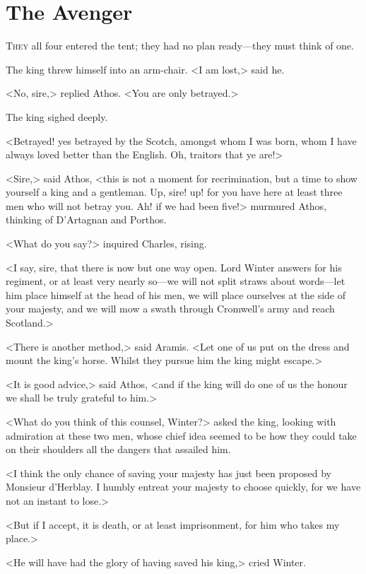 \chapter{The Avenger}

 \lettrine{T}{hey} all four entered the tent; they had no plan ready—they must think of one.

\zz
The king threw himself into an arm-chair. <I am lost,> said he.

\zz
<No, sire,> replied Athos. <You are only betrayed.>

The king sighed deeply.

<Betrayed! yes betrayed by the Scotch, amongst whom I was born, whom I have always loved better than the English. Oh, traitors that ye are!>

<Sire,> said Athos, <this is not a moment for recrimination, but a time to show yourself a king and a gentleman. Up, sire! up! for you have here at least three men who will not betray you. Ah! if we had been five!> murmured Athos, thinking of D'Artagnan and Porthos.

<What do you say?> inquired Charles, rising.

<I say, sire, that there is now but one way open. Lord Winter answers for his regiment, or at least very nearly so—we will not split straws about words—let him place himself at the head of his men, we will place ourselves at the side of your majesty, and we will mow a swath through Cromwell's army and reach Scotland.>

<There is another method,> said Aramis. <Let one of us put on the dress and mount the king's horse. Whilst they pursue him the king might escape.>

<It is good advice,> said Athos, <and if the king will do one of us the honour we shall be truly grateful to him.>

<What do you think of this counsel, Winter?> asked the king, looking with admiration at these two men, whose chief idea seemed to be how they could take on their shoulders all the dangers that assailed him.

<I think the only chance of saving your majesty has just been proposed by Monsieur d'Herblay. I humbly entreat your majesty to choose quickly, for we have not an instant to lose.>

<But if I accept, it is death, or at least imprisonment, for him who takes my place.>

<He will have had the glory of having saved his king,> cried Winter.

